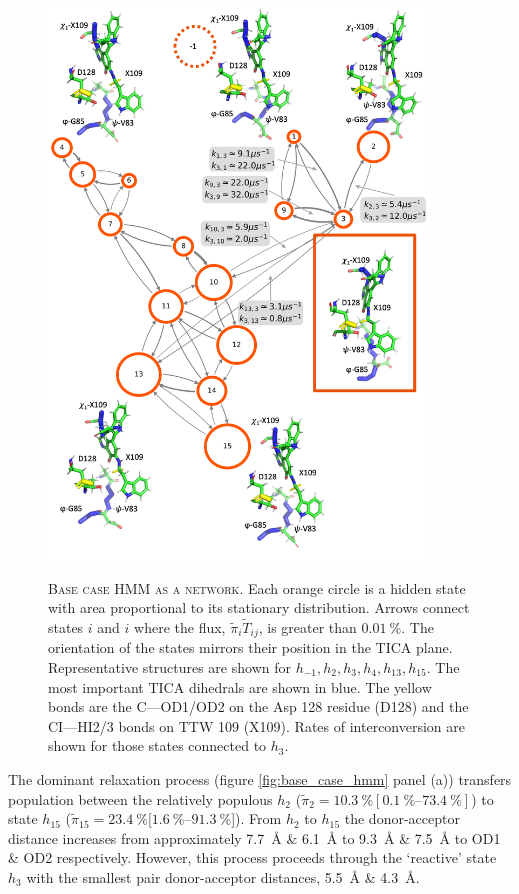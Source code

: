 \begin{figure}[p]
    \centering
    \caption[Base case HMM as a network]{\textsc{Base case HMM as a network}. Each orange circle is a hidden state with area proportional to its stationary distribution. Arrows connect states $i$ and $i$ where the flux, $\tilde{\pi}_{i}\tilde{T}_{ij}$, is greater than $\SI{0.01}{\percent}$. The orientation of the states mirrors their position in the TICA plane. Representative structures are shown for $h_{-1}, h_{2}, h_{3}, h_{4}, h_{13}, h_{15}$. The most important TICA dihedrals are shown in blue. The yellow bonds are the C---OD1/OD2 on the Asp 128 residue (D128) and the CI---HI2/3 bonds on TTW 109 (X109). Rates of interconversion are shown for those states connected to $h_{3}$. }
    \includegraphics[width=0.9\textwidth]{chapters/aadh/figures/base_case_network_plot.png}
    \label{fig:aadh_base_case_network}
\end{figure}

 The dominant relaxation process (figure \ref{fig:base_case_hmm} panel (a)) transfers population between the relatively populous $h_{2}$ ($\tilde{\pi}_{2} = \SI{10.3}{\percent} [\SIrange[range-phrase=--]{0.1}{73.4}{\percent}]$) to state $h_{15}$ ($\tilde{\pi}_{15}=\SI{23.4}{\percent} [\SIrange[range-phrase=--]{1.6}{91.3}{\percent}$]). From $h_{2}$ to $h_{15}$ the donor-acceptor distance increases from approximately \SI{7.7}{\angstrom} \& \SI{6.1}{\angstrom} to \SI{9.3}{\angstrom} \& \SI{7.5}{\angstrom} to OD1 \& OD2 respectively. However, this process proceeds through the `reactive' state $h_{3}$ with the smallest pair donor-acceptor distances, \SI{5.5}{\angstrom} \& \SI{4.3}{\angstrom}.  
 
